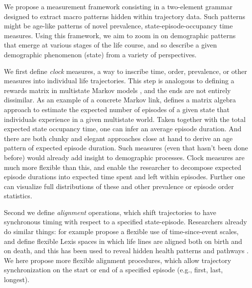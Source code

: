 \documentclass{article}
\begin{document}
% 
% 
% 
% 
We propose a measurement framework consisting in a two-element grammar designed to extract macro patterns hidden within trajectory data. Such patterns might be age-like patterns of novel prevalence, state-episode-occupancy time measures. Using this framework, we aim to zoom in on demographic patterns that emerge at various stages of the life course, and so describe a given demographic phenomenon (state) from a variety of perspectives. 

We first define \emph{clock} measures, a way to inscribe time, order, prevalence, or other measures into individual life trajectories. This step is analogous to defining a rewards matrix in multistate Markov models \citep[see e.g.][]{caswell2018matrix}, and the ends are not entirely dissimilar. As an example of a concrete Markov link, \citet{dudel2017b} defines a matrix algebra approach to estimate the expected number of episodes of a given state that individuals experience in a given multistate world. Taken together with the total expected state occupancy time, one can infer an average episode duration. And there are both clunky and elegant approaches close at hand to derive an age pattern of expected episode duration. Such measures (even that hasn't been done before) would already add insight to demographic processes. Clock measures are much more flexible than this, and enable the researcher to decompose expected episode durations into expected time spent and left within episodes. Further one can visualize full distributions of these and other prevalence or episode order statistics.

Second we define \emph{alignment} operations, which shift trajectories to have synchronous timing with respect to a specified state-episode. Researchers already do similar things: for example \citet{iacobelli2013multiple} propose a flexible use of time-since-event scales, and \citet{riffe2017unified} define flexible Lexis spaces in which life lines are aligned both on birth and on death, and this has been used to reveal hidden health patterns \citep{riffe2016time} and pathways \citep{potente2018disability, raab2018pathways}. We here propose more flexible alignment procedures, which allow trajectory synchronization on the start or end of a specified episode (e.g., first, last, longest).
\end{document}
